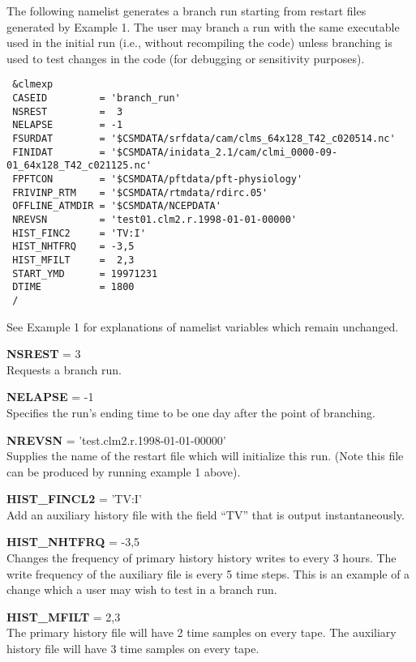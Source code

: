 \noindent 
The following namelist generates a branch run starting from restart
files generated by Example 1.  The user may branch a run with the same
executable used in the initial run (i.e., without recompiling the
code) unless branching is used to test changes in the code (for
debugging or sensitivity purposes).

\begin{verbatim}
 &clmexp 
 CASEID         = 'branch_run' 
 NSREST         =  3 
 NELAPSE        = -1 
 FSURDAT        = '$CSMDATA/srfdata/cam/clms_64x128_T42_c020514.nc'
 FINIDAT        = '$CSMDATA/inidata_2.1/cam/clmi_0000-09-01_64x128_T42_c021125.nc'
 FPFTCON        = '$CSMDATA/pftdata/pft-physiology' 
 FRIVINP_RTM    = '$CSMDATA/rtmdata/rdirc.05'
 OFFLINE_ATMDIR = '$CSMDATA/NCEPDATA' 
 NREVSN         = 'test01.clm2.r.1998-01-01-00000' 
 HIST_FINC2     = 'TV:I'
 HIST_NHTFRQ    = -3,5 
 HIST_MFILT     =  2,3
 START_YMD      = 19971231 
 DTIME          = 1800 
 / 
\end{verbatim}

\medskip \noindent 
See Example 1 for explanations of namelist variables which remain
unchanged.

\medskip \noindent 
{\bf NSREST} = 3 \\
Requests a branch run.

\medskip \noindent 
{\bf NELAPSE} = -1 \\
Specifies the run's ending time to be one day after the
point of branching.

\medskip \noindent 
{\bf NREVSN} = 'test.clm2.r.1998-01-01-00000' \\
Supplies the name of the restart file which will initialize this run.
(Note this file can be produced by running example 1 above).

\medskip \noindent 
{\bf HIST\_FINCL2} = 'TV:I' \\
Add an auxiliary history file with the field ``TV'' that is output instantaneously.

\medskip \noindent 
{\bf HIST\_NHTFRQ} = -3,5 \\ 
Changes the frequency of primary history history writes to every 3
hours.  The write frequency of the auxiliary file is every 5 time
steps.  This is an example of a change which a user may wish to test
in a branch run.

\medskip \noindent 
{\bf HIST\_MFILT} =  2,3 \\
The primary history file will have 2 time samples on every tape. The
auxiliary history file will have 3 time samples on every tape.

